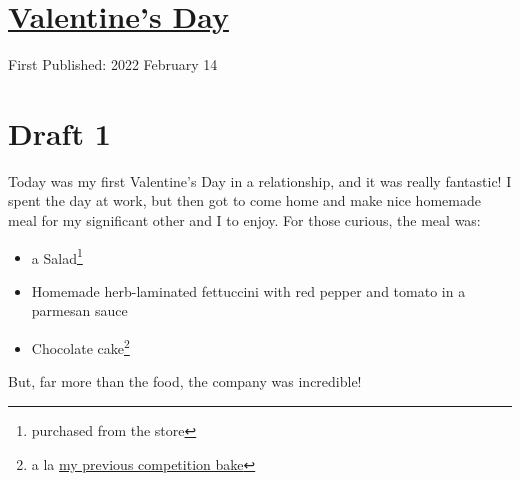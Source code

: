 \documentclass[12pt]{article}[titlepage]
\newcommand{\1}{\={a}}
\newcommand{\2}{\={e}}
\newcommand{\3}{\={\i}}
\newcommand{\4}{\=o}
\newcommand{\5}{\=u}
\newcommand{\6}{\={A}}
\renewcommand{\,}{\textsuperscript{,}}
\begin{document}
\doublespacing
\section{\href{valentines-2022.html}{Valentine's Day}}
First Published: 2022 February 14

\section{Draft 1}
Today was my first Valentine's Day in a relationship, and it was really fantastic!
I spent the day at work, but then got to come home and make nice homemade meal for my significant other and I to enjoy.
For those curious, the meal was:
\begin{itemize}
\item a Salad\footnote{purchased from the store}
\item Homemade herb-laminated fettuccini with red pepper and tomato in a parmesan sauce 
\item Chocolate cake\footnote{a la \href{baking-take-four.html}{my previous competition bake}}
\end{itemize}
But, far more than the food, the company was incredible!
\end{document}
